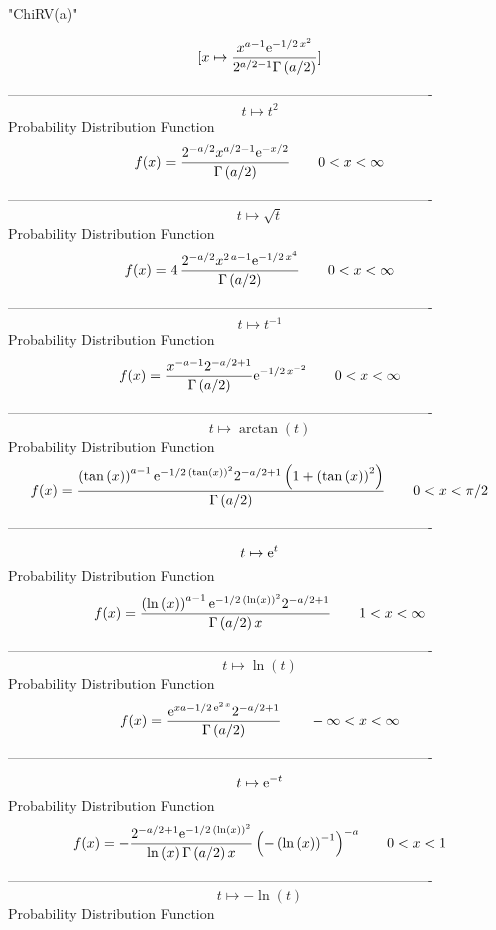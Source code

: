 \documentclass[12pt]{article}
\begin{document}
 
                                 "ChiRV(a)"

$$[x\mapsto {\frac {{x}^{a-1}{{\rm e}^{-1/2\,{x}^{2}}}}{{2}^{a/2-1}
\Gamma \left( a/2 \right) }}]
$$-------------------------------------------------------------------------------------------  \\$$t\mapsto {t}^{2}
$$Probability Distribution Function 
$$  f(x)={\frac {{2}^{-a/2}{x}^{a/2-1}{{\rm e}^{-x/2}}}{\Gamma \left( a/2
 \right) }}
 \qquad0
 < x < \infty 
$$-------------------------------------------------------------------------------------------  \\$$t\mapsto \sqrt {t}
$$Probability Distribution Function 
$$  f(x)=4\,{\frac {{2}^{-a/2}{x}^{2\,a-1}{{\rm e}^{-1/2\,{x}^{4}}}}{\Gamma
 \left( a/2 \right) }}
 \qquad0
 < x < \infty 
$$-------------------------------------------------------------------------------------------  \\$$t\mapsto {t}^{-1}
$$Probability Distribution Function 
$$  f(x)={\frac {{x}^{-a-1}{2}^{-a/2+1}}{\Gamma \left( a/2 \right) }{{\rm e}^{-
1/2\,{x}^{-2}}}}
 \qquad0
 < x < \infty 
$$-------------------------------------------------------------------------------------------  \\$$t\mapsto \arctan \left( t \right) 
$$Probability Distribution Function 
$$  f(x)={\frac { \left( \tan \left( x \right)  \right) ^{a-1}{{\rm e}^{-1/2\,
 \left( \tan \left( x \right)  \right) ^{2}}}{2}^{-a/2+1} \left( 1+
 \left( \tan \left( x \right)  \right) ^{2} \right) }{\Gamma \left( a/
2 \right) }}
 \qquad0
 < x < \pi/2
$$-------------------------------------------------------------------------------------------  \\$$t\mapsto {{\rm e}^{t}}
$$Probability Distribution Function 
$$  f(x)={\frac { \left( \ln  \left( x \right)  \right) ^{a-1}{{\rm e}^{-1/2\,
 \left( \ln  \left( x \right)  \right) ^{2}}}{2}^{-a/2+1}}{\Gamma
 \left( a/2 \right) x}}
 \qquad1
 < x < \infty 
$$-------------------------------------------------------------------------------------------  \\$$t\mapsto \ln  \left( t \right) 
$$Probability Distribution Function 
$$  f(x)={\frac {{{\rm e}^{xa-1/2\,{{\rm e}^{2\,x}}}}{2}^{-a/2+1}}{\Gamma
 \left( a/2 \right) }}
 \qquad-\infty 
 < x < \infty 
$$-------------------------------------------------------------------------------------------  \\$$t\mapsto {{\rm e}^{-t}}
$$Probability Distribution Function 
$$  f(x)=-{\frac {{2}^{-a/2+1}{{\rm e}^{-1/2\, \left( \ln  \left( x \right) 
 \right) ^{2}}}}{\ln  \left( x \right) \Gamma \left( a/2 \right) x}
 \left( - \left( \ln  \left( x \right)  \right) ^{-1} \right) ^{-a}}
 \qquad0
 < x < 1
$$-------------------------------------------------------------------------------------------  \\$$t\mapsto -\ln  \left( t \right) 
$$Probability Distribution Function 
\end{document}
